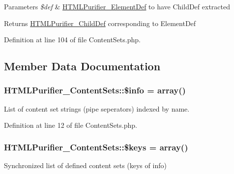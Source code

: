 \begin{DoxyParams}{Parameters}
{\em \$def} & \hyperlink{classHTMLPurifier__ElementDef}{H\+T\+M\+L\+Purifier\+\_\+\+Element\+Def} to have Child\+Def extracted \\
\hline
\end{DoxyParams}
\begin{DoxyReturn}{Returns}
\hyperlink{classHTMLPurifier__ChildDef}{H\+T\+M\+L\+Purifier\+\_\+\+Child\+Def} corresponding to Element\+Def 
\end{DoxyReturn}


Definition at line 104 of file Content\+Sets.\+php.



\subsection{Member Data Documentation}
\hypertarget{classHTMLPurifier__ContentSets_a59146cf7fed870a194f1459fc3291329}{
\subsubsection[{\$info}]{\setlength{\rightskip}{0pt plus 5cm}H\+T\+M\+L\+Purifier\+\_\+\+Content\+Sets\+::\$info = array()}}\label{classHTMLPurifier__ContentSets_a59146cf7fed870a194f1459fc3291329}
List of content set strings (pipe seperators) indexed by name. 

Definition at line 12 of file Content\+Sets.\+php.

\hypertarget{classHTMLPurifier__ContentSets_abf3eac7ddc8ffaddea9a6cc5d599a69c}{
\subsubsection[{\$keys}]{\setlength{\rightskip}{0pt plus 5cm}H\+T\+M\+L\+Purifier\+\_\+\+Content\+Sets\+::\$keys = array()\hspace{0.3cm}{\ttfamily [protected]}}}\label{classHTMLPurifier__ContentSets_abf3eac7ddc8ffaddea9a6cc5d599a69c}
Synchronized list of defined content sets (keys of info) 

